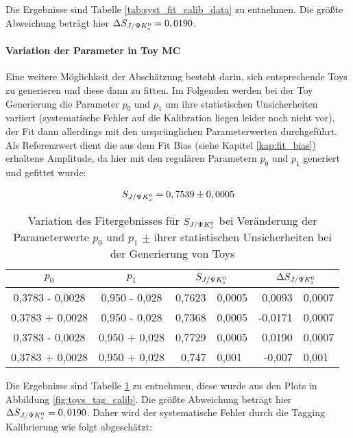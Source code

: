 Die Ergebnisse sind Tabelle \ref{tab:syst_fit_calib_data} zu entnehmen. Die größte Abweichung beträgt hier $\Delta S_{J/\Psi K_s^0} = 0,0190$.

\paragraph{Variation der Parameter in \gls{Toy MC}}
Eine weitere Möglichkeit der Abschätzung besteht darin, sich entsprechende Toys zu generieren und diese dann zu fitten. Im Folgenden werden bei der Toy Generierung die Parameter $p_0$ und $p_1$ um ihre statistischen Unsicherheiten variiert (systematische Fehler auf die Kalibration liegen leider noch nicht vor), der Fit dann allerdings mit den ursprünglichen Parameterwerten durchgeführt. Als Referenzwert dient die aus dem Fit Bias (siehe Kapitel \ref{kap:fit_bias}) erhaltene Amplitude, da hier mit den regulären Parametern $p_0$ und $p_1$ generiert und gefittet wurde:

\begin{align}
S_{J/\Psi K_s^0} = 0,7539 \pm 0,0005
\end{align}

\begin{table}[hptb]
\centering
\caption{Variation des Fitergebnisses für $S_{J/\Psi K_s^0}$ bei Veränderung der Parameterwerte $p_0$ und $p_1$ $\pm$ ihrer statistischen Unsicherheiten bei der Generierung von Toys}
\label{tab:syst_fit_calib_toys}
\begin{tabular}{cc|r@{$\pm$}l|r@{$\pm$}l}
\hline\hline
$p_0$  &  $p_1$  &  \multicolumn{2}{c}{$S_{J/\Psi K_s^0}$}  & \multicolumn{2}{c}{$\Delta S_{J/\Psi K_s^0}$}   \\ \hline
0,3783 - 0,0028  &  0,950 - 0,028  &  0,7623 & 0,0005  &   0,0093 & 0,0007 \\
0,3783 + 0,0028  &  0,950 - 0,028  &  0,7368 & 0,0005  &  -0,0171 & 0,0007 \\
0,3783 - 0,0028  &  0,950 + 0,028  &  0,7729 & 0,0005  &   0,0190 & 0,0007 \\
0,3783 + 0,0028  &  0,950 + 0,028  &  0,747  & 0,001   &  -0,007  & 0,001 \\
\hline\hline
\end{tabular}
\end{table}

Die Ergebnisse sind Tabelle \ref{tab:syst_fit_calib_toys} zu entnehmen, diese wurde aus den Plots in Abbildung \ref{fig:toys_tag_calib}. Die größte Abweichung beträgt hier $\Delta S_{J/\Psi K_s^0} = 0,0190$. Daher wird der systematische Fehler durch die Tagging Kalibrierung wie folgt abgeschätzt:

